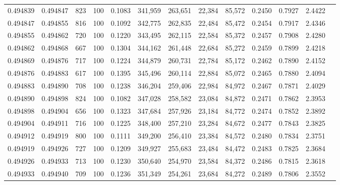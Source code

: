 \begin{tabular}{rrrrrrrrrrrrr}
0.494839 & 0.494847 &   823 & 100 &                                     0.1083 & 341,959 & 263,651 &  22,384 &  85,572 & 0.2450 & 0.7927 & 2.4422 \\
0.494847 & 0.494855 &   816 & 100 &                                     0.1092 & 342,775 & 262,835 &  22,484 &  85,472 & 0.2454 & 0.7917 & 2.4346 \\
0.494855 & 0.494862 &   720 & 100 &                                     0.1220 & 343,495 & 262,115 &  22,584 &  85,372 & 0.2457 & 0.7908 & 2.4280 \\
0.494862 & 0.494868 &   667 & 100 &                                     0.1304 & 344,162 & 261,448 &  22,684 &  85,272 & 0.2459 & 0.7899 & 2.4218 \\
0.494869 & 0.494876 &   717 & 100 &                                     0.1224 & 344,879 & 260,731 &  22,784 &  85,172 & 0.2462 & 0.7890 & 2.4152 \\
0.494876 & 0.494883 &   617 & 100 &                                     0.1395 & 345,496 & 260,114 &  22,884 &  85,072 & 0.2465 & 0.7880 & 2.4094 \\
0.494883 & 0.494890 &   708 & 100 &                                     0.1238 & 346,204 & 259,406 &  22,984 &  84,972 & 0.2467 & 0.7871 & 2.4029 \\
0.494890 & 0.494898 &   824 & 100 &                                     0.1082 & 347,028 & 258,582 &  23,084 &  84,872 & 0.2471 & 0.7862 & 2.3953 \\
0.494898 & 0.494904 &   656 & 100 &                                     0.1323 & 347,684 & 257,926 &  23,184 &  84,772 & 0.2474 & 0.7852 & 2.3892 \\
0.494904 & 0.494911 &   716 & 100 &                                     0.1225 & 348,400 & 257,210 &  23,284 &  84,672 & 0.2477 & 0.7843 & 2.3825 \\
0.494912 & 0.494919 &   800 & 100 &                                     0.1111 & 349,200 & 256,410 &  23,384 &  84,572 & 0.2480 & 0.7834 & 2.3751 \\
0.494919 & 0.494926 &   727 & 100 &                                     0.1209 & 349,927 & 255,683 &  23,484 &  84,472 & 0.2483 & 0.7825 & 2.3684 \\
0.494926 & 0.494933 &   713 & 100 &                                     0.1230 & 350,640 & 254,970 &  23,584 &  84,372 & 0.2486 & 0.7815 & 2.3618 \\
0.494933 & 0.494940 &   709 & 100 &                                     0.1236 & 351,349 & 254,261 &  23,684 &  84,272 & 0.2489 & 0.7806 & 2.3552 \\

\end{tabular}
